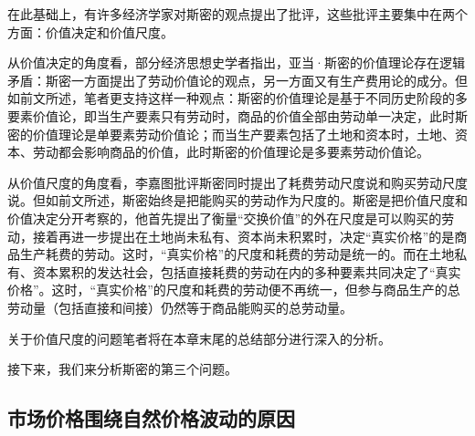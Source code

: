 在此基础上，有许多经济学家对斯密的观点提出了批评，这些批评主要集中在两个方面：价值决定和价值尺度。

从价值决定的角度看，部分经济思想史学者指出，亚当·斯密的价值理论存在逻辑矛盾：斯密一方面提出了劳动价值论的观点，另一方面又有生产费用论的成分\cite[136]{CaiJiMingCongGuDianZhengZhiJingJiXueDaoZhongGuoTeSeSheHuiZhuYiZhengZhiJingJiXueJiYuZhongGuoShiJiaoDeZhengZhiJingJiXueYanBianShangCe2023}\cite[294]{YueSeFu*XiongBiTeJingJiFenXiShiDi1Juan2017}\cite[47]{ZhongGongZhongYangMaKeSiEnGeSiLieNingSiDaLinZhuZuoBianYiJuMaKeSiEnGeSiQuanJiDi26JuanDi1Ce1972}。但如前文所述，笔者更支持这样一种观点：斯密的价值理论是基于不同历史阶段的多要素价值论\cite[136]{CaiJiMingCongGuDianZhengZhiJingJiXueDaoZhongGuoTeSeSheHuiZhuYiZhengZhiJingJiXueJiYuZhongGuoShiJiaoDeZhengZhiJingJiXueYanBianShangCe2023}，即当生产要素只有劳动时，商品的价值全部由劳动单一决定，此时斯密的价值理论是单要素劳动价值论；而当生产要素包括了土地和资本时，土地、资本、劳动都会影响商品的价值，此时斯密的价值理论是多要素劳动价值论\cite{peachAdamSmithsLabor2020}\cite[21]{MaKe*BuLaoGeJingJiLiLunDeHuiGu2018}\cite[70-71]{meekStudiesLaborTheory1973}。

从价值尺度的角度看，李嘉图批评斯密同时提出了耗费劳动尺度说和购买劳动尺度说\cite[7]{DaWei*LiJiaTuZhengZhiJingJiXueJiFuShuiYuanLi2021}。但如前文所述，斯密始终是把能购买的劳动作为尺度的\cite[142]{CaiJiMingCongGuDianZhengZhiJingJiXueDaoZhongGuoTeSeSheHuiZhuYiZhengZhiJingJiXueJiYuZhongGuoShiJiaoDeZhengZhiJingJiXueYanBianShangCe2023}\cite[63]{meekStudiesLaborTheory1973}。斯密是把价值尺度和价值决定分开考察的\cite[73]{ChenDaiSunCongGuDianJingJiXuePaiDaoMaKeSiRuoGanZhuYaoXueShuoFaZhanLueLun2014}，他首先提出了衡量“交换价值”的外在尺度是可以购买的劳动\cite{rodriguezherreraAdamSmithsConcept2016}，接着再进一步提出在土地尚未私有、资本尚未积累时，决定“真实价格”的是商品生产耗费的劳动。这时，“真实价格”的尺度和耗费的劳动是统一的。而在土地私有、资本累积的发达社会，包括直接耗费的劳动在内的多种要素共同决定了“真实价格”。这时，“真实价格”的尺度和耗费的劳动便不再统一，但参与商品生产的总劳动量（包括直接和间接）仍然等于商品能购买的总劳动量。\cite[67-69]{CaiJiMingLunHaoFeiDeLaoDongYuGouMaiDeLaoDongZaiJieZhiLiLunZhongDeZuoYong2022}

关于价值尺度的问题笔者将在本章末尾的总结部分进行深入的分析。

接下来，我们来分析斯密的第三个问题。

\subsection{市场价格围绕自然价格波动的原因}

